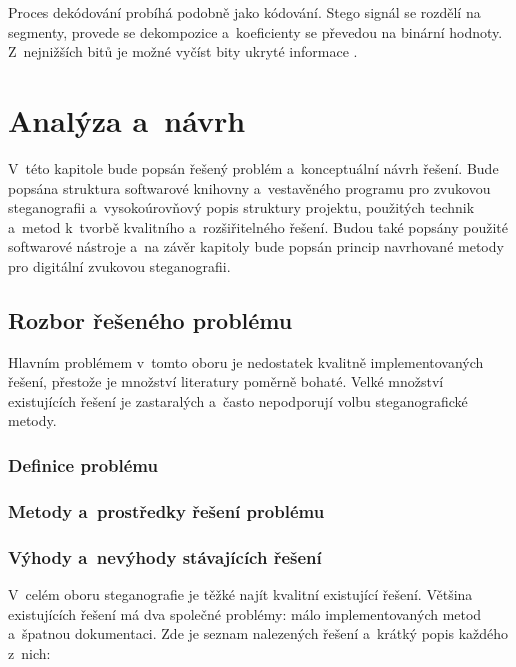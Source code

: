 Proces dekódování probíhá podobně jako kódování. Stego signál se rozdělí na
segmenty, provede se dekompozice a~koeficienty se převedou na binární hodnoty.
Z~nejnižších bitů je možné vyčíst bity ukryté informace \cite{Pooyan2007}.


\chapter{Analýza a~návrh}
\label{cha:library-design}

V~této kapitole bude popsán řešený problém a~konceptuální návrh řešení. Bude
popsána struktura softwarové knihovny a~vestavěného programu pro zvukovou
steganografii a~vysokoúrovňový popis struktury projektu, použitých technik
a~metod k~tvorbě kvalitního a~rozšiřitelného řešení. Budou také popsány použité
softwarové nástroje a~na závěr kapitoly bude popsán princip navrhované metody
pro digitální zvukovou steganografii.

\section{Rozbor řešeného problému}
\label{sec:problem-analysis}

Hlavním problémem v~tomto oboru je nedostatek kvalitně implementovaných řešení,
přestože je množství literatury poměrně bohaté. Velké množství existujících
řešení je zastaralých a~často nepodporují volbu steganografické metody.

\subsection*{Definice problému}
\label{sub:problem-definition}

\blindtext

\subsection*{Metody a~prostředky řešení problému}
\label{sub:problem-solution}

\blindtext

\subsection*{Výhody a~nevýhody stávajících řešení}
\label{sub:pros-cons-existing-solutions}

V~celém oboru steganografie je těžké najít kvalitní existující řešení. Většina
existujících řešení má dva společné problémy: málo implementovaných metod
a~špatnou dokumentaci. Zde je seznam nalezených řešení a~krátký popis každého
z~nich:

